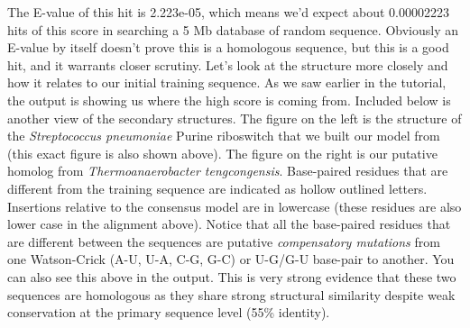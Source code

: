 The E-value of this hit is 2.223e-05, which means we'd expect about
0.00002223 hits of this score in searching a 5 Mb database of random
sequence. Obviously an E-value by itself doesn't prove this is a
homologous sequence, but this is a good hit, and it warrants closer
scrutiny. 
Let's look at the structure more closely and how it relates to our
initial training sequence.  As we saw earlier in the tutorial, the
 output is showing us where the high score is coming
from. Included below is another view of the secondary structures.  The
figure on the left is the structure of the \emph{Streptococcus
pneumoniae} Purine riboswitch that we built our model from (this exact
figure is also shown above).  The figure on the right is our putative
homolog from \emph{Thermoanaerobacter tengcongensis}.  Base-paired
residues that are different from the training sequence are indicated
as hollow outlined letters. Insertions relative to the consensus model
are in lowercase (these residues are also lower case in
the  alignment above). Notice that all the base-paired
residues that are different between the sequences are putative
\emph{compensatory mutations} from one Watson-Crick (A-U, U-A, C-G,
G-C) or U-G/G-U base-pair to another. You can also see this above in
the  output. This is very strong evidence that these
two sequences are homologous as they share strong structural
similarity despite weak conservation at the primary sequence level
(55\% identity).

